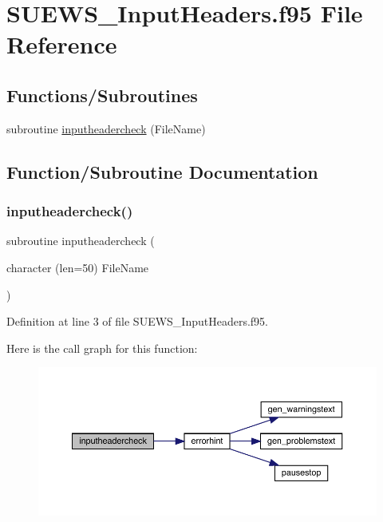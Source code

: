 \hypertarget{_s_u_e_w_s___input_headers_8f95}{}\section{S\+U\+E\+W\+S\+\_\+\+Input\+Headers.\+f95 File Reference}
\label{_s_u_e_w_s___input_headers_8f95}
\subsection*{Functions/\+Subroutines}
\begin{DoxyCompactItemize}
\item 
subroutine \hyperlink{_s_u_e_w_s___input_headers_8f95_a3badd4ee4acb7b79e0267acddf3894e2}{inputheadercheck} (File\+Name)
\end{DoxyCompactItemize}


\subsection{Function/\+Subroutine Documentation}
\mbox{\label{_s_u_e_w_s___input_headers_8f95_a3badd4ee4acb7b79e0267acddf3894e2}} 
\subsubsection{\texorpdfstring{inputheadercheck()}{inputheadercheck()}}
{\footnotesize\ttfamily subroutine inputheadercheck (\begin{DoxyParamCaption}\item[{character (len=50)}]{File\+Name }\end{DoxyParamCaption})}



Definition at line 3 of file S\+U\+E\+W\+S\+\_\+\+Input\+Headers.\+f95.

Here is the call graph for this function\+:\nopagebreak
\begin{figure}[H]
\begin{center}
\leavevmode
\includegraphics[width=350pt]{_s_u_e_w_s___input_headers_8f95_a3badd4ee4acb7b79e0267acddf3894e2_cgraph}
\end{center}
\end{figure}
